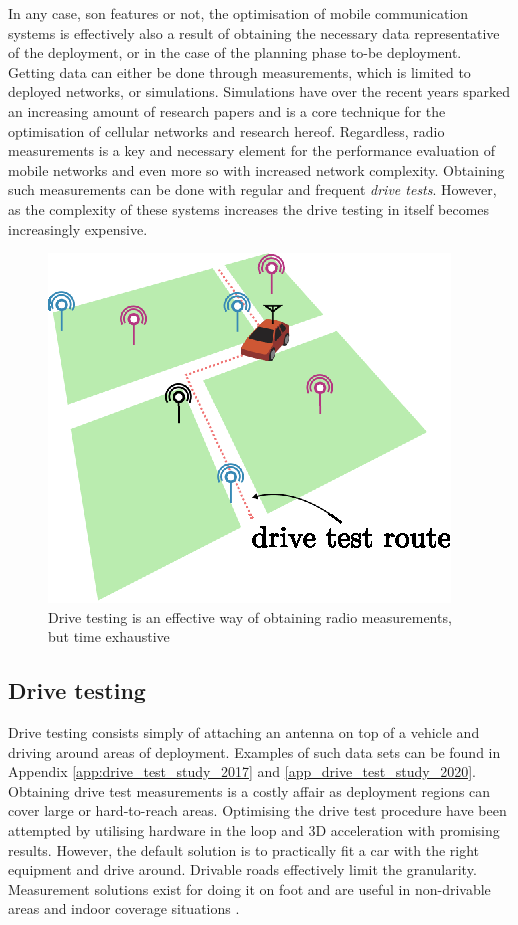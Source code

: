 In any case, \gls{son} features or not, the optimisation of mobile communication systems is effectively also a result of obtaining the necessary data representative of the deployment, or in the case of the planning phase to-be deployment. Getting data can either be done through measurements, which is limited to deployed networks, or simulations. Simulations have over the recent years sparked an increasing amount of research papers and is a core technique for the optimisation of cellular networks and research hereof. Regardless, radio measurements is a key and necessary element for the performance evaluation of mobile networks and even more so with increased network complexity. Obtaining such measurements can be done with regular and frequent \emph{drive tests}. However, as the complexity of these systems increases the drive testing in itself becomes increasingly expensive. 
\begin{figure}
    \centering
    \includegraphics[width=.5\textwidth]{chapters/figures/drive_test_illustration.eps}
    \caption{Drive testing is an effective way of obtaining radio measurements, but time exhaustive}
    \label{fig:my_label}
\end{figure}

\subsection{Drive testing}\label{sec:drive_testing}
Drive testing consists simply of attaching an antenna on top of a vehicle and driving around areas of deployment. Examples of such data sets can be found in Appendix \ref{app:drive_test_study_2017} and \ref{app_drive_test_study_2020}. Obtaining drive test measurements is a costly affair as deployment regions can cover large or hard-to-reach areas. Optimising the drive test procedure have been attempted by utilising hardware in the loop and 3D acceleration \cite{Charitos2017} with promising results. However, the default solution is to practically fit a car with the right equipment and drive around. Drivable roads effectively limit the granularity. Measurement solutions exist for doing it on foot and are useful in non-drivable areas and indoor coverage situations \cite{ROMESmanual}. 

